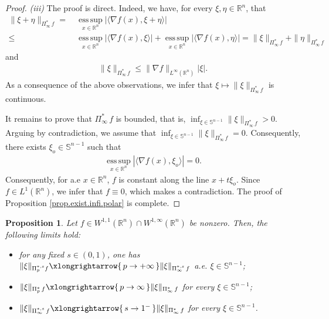 \documentclass[11pt, reqno]{article}
\newtheorem{proposition}[theorem]{Proposition}
\theoremstyle{definition}
\numberwithin{equation}{section}
\newcommand{\R}{\mathbb{R}}
\newcommand{\Sphere}{\mathbb{S}^{n - 1}}
\newcommand{\esssup}{\operatorname*{ess\,sup}}
\begin{document}
\begin{proof}
 	\medskip
 	
 	\textit{(iii)}
 	 The proof is direct.
 	 Indeed, we have, for every $\xi, \eta \in \R^n$, that
 	 \begin{align*}
 	 	\| \xi + \eta \|_{\Pi^\ast_\infty \, f} = & ~
        \esssup_{x \in \R^n} | \langle \nabla f(x), \xi + \eta \rangle| \\
        \leq & ~ \esssup_{x \in \R^n} | \langle \nabla f(x), \xi \rangle | + \esssup_{x \in \R^n} |\langle \nabla f(x), \eta \rangle| = \| \xi \|_{\Pi^\ast_\infty \, f} + \| \eta \|_{\Pi^\ast_\infty \, f}
 	 \end{align*}
 	 and
 	 \begin{align*}
 	 	\| \xi \|_{\Pi^\ast_\infty \, f } \leq \| \nabla f \|_{L^\infty(\R^n)} |\xi|.
 	 \end{align*}
 	 As a consequence of the above observations, we infer that $\xi \mapsto \| \xi \|_{\Pi^\ast_\infty \, f}$ is continuous.

        \medskip

        It remains to prove that $\Pi^\ast_\infty \, f$ is bounded, that is, $\textstyle\inf_{\xi \in \Sphere} \| \xi \|_{\Pi^\ast_\infty \, f} > 0$.
        Arguing by contradiction, we assume that $\textstyle\inf_{\xi \in \Sphere} \| \xi \|_{\Pi^\ast_\infty \, f} = 0$.
        Consequently, there exists $\xi_o \in \Sphere$ such that 
            \begin{align*}
                \esssup_{x \in \R^n} | \langle \nabla f(x), \xi_o \rangle | = 0.
            \end{align*}
Consequently, for a.e $x \in \R^n$, $f$ is constant along the line $x + t\xi_o$.
        Since $f \in L^1(\R^n)$, we infer that $f \equiv 0$, which makes a contradiction.
 	The proof of Proposition \ref{prop.exist.infi.polar} is complete.
\end{proof}

\begin{proposition}\label{prop.lim.gauge}
    Let $f \in W^{1, 1}(\R^n) \cap W^{1, \infty}(\R^n)$ be nonzero.
    Then, the following limits hold:
    \begin{itemize}
        \item[(i)] for any fixed $s \in (0, 1)$, one has $\| \xi \|_{\Pi^{\ast, s}_p f} \xlongrightarrow{\, p \to + \infty \,} \| \xi \|_{\Pi^{\ast, s}_\infty \, f}$ a.e. $\xi \in \Sphere$;

        \item[(ii)] $\| \xi \|_{\Pi^\ast_p \, f} \xlongrightarrow{\, p \to  \infty \,} \| \xi \|_{\Pi^\ast_\infty \, f}$ for every $\xi \in \Sphere$;

        \item[(iii)] $\| \xi \|_{\Pi^{\ast, s}_\infty \, f} \xlongrightarrow{\, s \to 1^- \,} \| \xi \|_{\Pi^\ast_\infty \, f}$ for every $\xi \in \Sphere$.
    \end{itemize}
\end{proposition}
\end{document}
